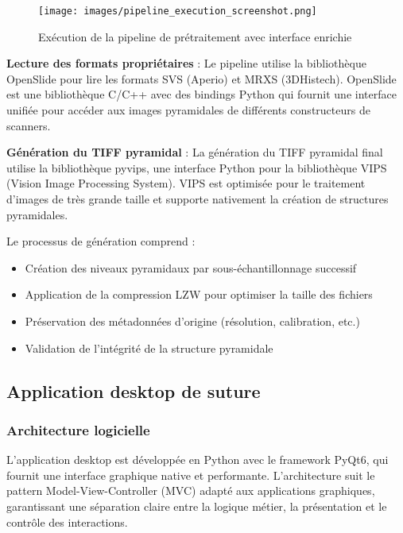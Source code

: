 \documentclass[12pt,a4paper]{report}
\begin{document}
\begin{figure}[H]
\centering
\texttt{[image: images/pipeline\_execution\_screenshot.png]}
\caption{Exécution de la pipeline de prétraitement avec interface enrichie}
\label{fig:pipeline_execution}
\end{figure}

\textbf{Lecture des formats propriétaires} : Le pipeline utilise la bibliothèque OpenSlide pour lire les formats SVS (Aperio) et MRXS (3DHistech). OpenSlide est une bibliothèque C/C++ avec des bindings Python qui fournit une interface unifiée pour accéder aux images pyramidales de différents constructeurs de scanners.

\textbf{Génération du TIFF pyramidal} : La génération du TIFF pyramidal final utilise la bibliothèque pyvips, une interface Python pour la bibliothèque VIPS (Vision Image Processing System). VIPS est optimisée pour le traitement d'images de très grande taille et supporte nativement la création de structures pyramidales.

Le processus de génération comprend :
\begin{itemize}
\item Création des niveaux pyramidaux par sous-échantillonnage successif
\item Application de la compression LZW pour optimiser la taille des fichiers
\item Préservation des métadonnées d'origine (résolution, calibration, etc.)
\item Validation de l'intégrité de la structure pyramidale
\end{itemize}

\subsection{Application desktop de suture}

\subsubsection{Architecture logicielle}

L'application desktop est développée en Python avec le framework PyQt6, qui fournit une interface graphique native et performante. L'architecture suit le pattern Model-View-Controller (MVC) adapté aux applications graphiques, garantissant une séparation claire entre la logique métier, la présentation et le contrôle des interactions.
\end{document}
